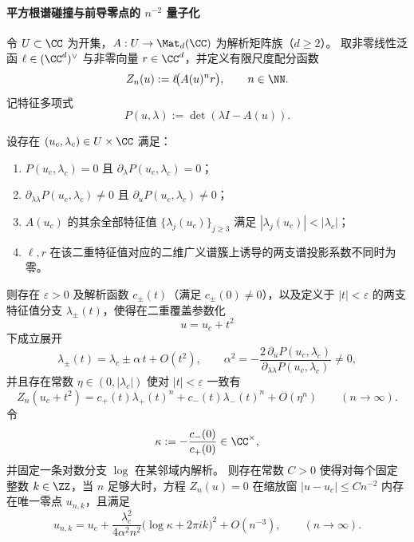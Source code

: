 \paragraph{平方根谱碰撞与前导零点的 \texorpdfstring{$n^{-2}$}{n^{-2}} 量子化}
令 \(U\subset\CC\) 为开集，\(A:U\to\Mat_{d}(\CC)\) 为解析矩阵族（\(d\ge 2\)）。
取非零线性泛函 \(\ell\in(\CC^d)^\vee\) 与非零向量 \(r\in\CC^d\)，并定义有限尺度配分函数
\[
Z_n(u):=\ell\!\bigl(A(u)^n r\bigr),\qquad n\in\NN.
\]
记特征多项式
\[
P(u,\lambda):=\det(\lambda I-A(u)).
\]

\begin{theorem}\label{thm:xi-leyang-square-root-collision-leading-zeros-n2}
设存在 \((u_c,\lambda_c)\in U\times\CC\) 满足：
\begin{enumerate}
  \item \(P(u_c,\lambda_c)=0\) 且 \(\partial_\lambda P(u_c,\lambda_c)=0\)；
  \item \(\partial_{\lambda\lambda}P(u_c,\lambda_c)\neq 0\) 且 \(\partial_u P(u_c,\lambda_c)\neq 0\)；
  \item \(A(u_c)\) 的其余全部特征值 \(\{\lambda_j(u_c)\}_{j\ge 3}\) 满足 \(|\lambda_j(u_c)|<|\lambda_c|\)；
  \item \(\ell,r\) 在该二重特征值对应的二维广义谱簇上诱导的两支谱投影系数不同时为零。
\end{enumerate}
则存在 \(\varepsilon>0\) 及解析函数 \(c_\pm(t)\)（满足 \(c_\pm(0)\neq 0\)），以及定义于 \(|t|<\varepsilon\) 的两支特征值分支 \(\lambda_\pm(t)\)，使得在二重覆盖参数化
\[
u=u_c+t^2
\]
下成立展开
\[
\lambda_\pm(t)=\lambda_c\pm \alpha\,t+O(t^2),
\qquad
\alpha^2=-\frac{2\,\partial_u P(u_c,\lambda_c)}{\partial_{\lambda\lambda}P(u_c,\lambda_c)}\neq 0,
\]
并且存在常数 \(\eta\in(0,|\lambda_c|)\) 使对 \(|t|<\varepsilon\) 一致有
\[
Z_n(u_c+t^2)=c_+(t)\lambda_+(t)^n+c_-(t)\lambda_-(t)^n+O(\eta^n)
\qquad(n\to\infty).
\]
令
\[
\kappa:=-\frac{c_-(0)}{c_+(0)}\in\CC^\times,
\]
并固定一条对数分支 \(\log\) 在某邻域内解析。
则存在常数 \(C>0\) 使得对每个固定整数 \(k\in\ZZ\)，当 \(n\) 足够大时，方程 \(Z_n(u)=0\) 在缩放窗 \(|u-u_c|\le Cn^{-2}\) 内存在唯一零点 \(u_{n,k}\)，且满足
\[
u_{n,k}
=
u_c+\frac{\lambda_c^{2}}{4\alpha^{2}n^{2}}
\bigl(\log\kappa+2\pi i k\bigr)^{2}
+O(n^{-3}),
\qquad(n\to\infty).
\]
\end{theorem}
